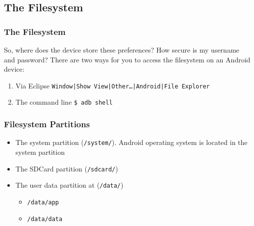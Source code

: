 \subsection{The Filesystem}
\begin{frame}[containsverbatim]
\frametitle{The Filesystem}
So, where does the device store these preferences? How secure is my username and
password? There are two ways for you to access the filesystem on an Android device: 

\begin{enumerate}
\item Via Eclipse \texttt{Window|Show View|Other\dots|Android|File Explorer}

\item  The command line \texttt{\$ adb shell}
\end{enumerate}

\end{frame}
\begin{frame}[containsverbatim]
\frametitle{Filesystem Partitions}

\begin{itemize}
\item The system partition (\texttt{/system/}). Android operating system is located in the system partition
\item The SDCard partition (\texttt{/sdcard/})
\item The user data partition at (\texttt{/data/})
	\begin{itemize}
		\item \texttt{/data/app}
		\item \texttt{/data/data}
	\end{itemize}
\end{itemize}

\end{frame}

